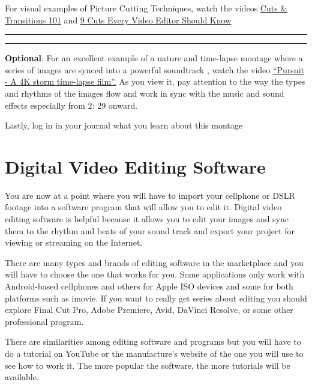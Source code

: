 \documentclass[
]{book}
\begin{document}
\begin{reflect}
For visual examples of Picture Cutting Techniques, watch the videos \href{https://www.youtube.com/watch?v=OAH0MoAv2CI}{Cuts \& Transitions 101} and \href{https://www.youtube.com/watch?v=Wv3Hmf2Dxlo}{9 Cuts Every Video Editor Should Know}

\begin{center}\rule{0.5\linewidth}{0.5pt}\end{center}

\begin{center}\rule{0.5\linewidth}{0.5pt}\end{center}

\textbf{Optional}: For an excellent example of a nature and time-lapse montage where a series of images are synced into a powerful soundtrack , watch the video \href{https://www.youtube.com/watch?v=oagszCmJLpU}{``Pursuit - A 4K storm time-lapse film''.} As you view it, pay attention to the way the types and rhythms of the images flow and work in sync with the music and sound effects especially from 2: 29 onward.

Lastly, log in in your journal what you learn about this montage
\end{reflect}

\hypertarget{digital-video-editing-software}{%
\section{Digital Video Editing Software}\label{digital-video-editing-software}}

You are now at a point where you will have to import your cellphone or DSLR footage into a software program that will allow you to edit it. Digital video editing software is helpful because it allows you to edit your images and sync them to the rhythm and beats of your sound track and export your project for viewing or streaming on the Internet.

There are many types and brands of editing software in the marketplace and you will have to choose the one that works for you. Some applications only work with Android-based cellphones and others for Apple ISO devices and some for both platforms such as imovie. If you want to really get series about editing you should explore Final Cut Pro, Adobe Premiere, Avid, DaVinci Resolve, or some other professional program.

There are similarities among editing software and programs but you will have to do a tutorial on YouTube or the manufacture's website of the one you will use to see how to work it. The more popular the software, the more tutorials will be available.
\end{document}
